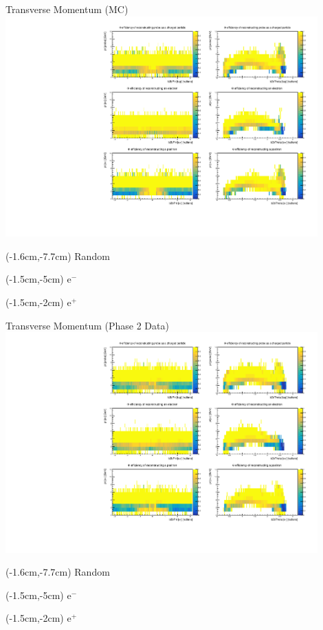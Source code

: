 \documentclass[10pt]{beamer}
\begin{document}
\begin{frame}{Transverse Momentum (MC)}
	\centering
	\includegraphics[width=0.9\textwidth]{Momentum/transM_MC.pdf}
	\begin{textblock*}{0.3\textwidth}(-1.6cm,-7.7cm)
		Random
	\end{textblock*}
	
	\begin{textblock*}{0.3\textwidth}(-1.5cm,-5cm)
		$\textrm{e}^-$
	\end{textblock*}
	\begin{textblock*}{0.3\textwidth}(-1.5cm,-2cm)
		$\textrm{e}^+$
	\end{textblock*}
\end{frame}

\begin{frame}{Transverse Momentum (Phase 2 Data)}
	\centering
	\includegraphics[width=0.9\textwidth]{Momentum/transM_Data.pdf}
\begin{textblock*}{0.3\textwidth}(-1.6cm,-7.7cm)
	Random
\end{textblock*}

\begin{textblock*}{0.3\textwidth}(-1.5cm,-5cm)
	$\textrm{e}^-$
\end{textblock*}
\begin{textblock*}{0.3\textwidth}(-1.5cm,-2cm)
	$\textrm{e}^+$
\end{textblock*}

\end{frame}
\end{document}
